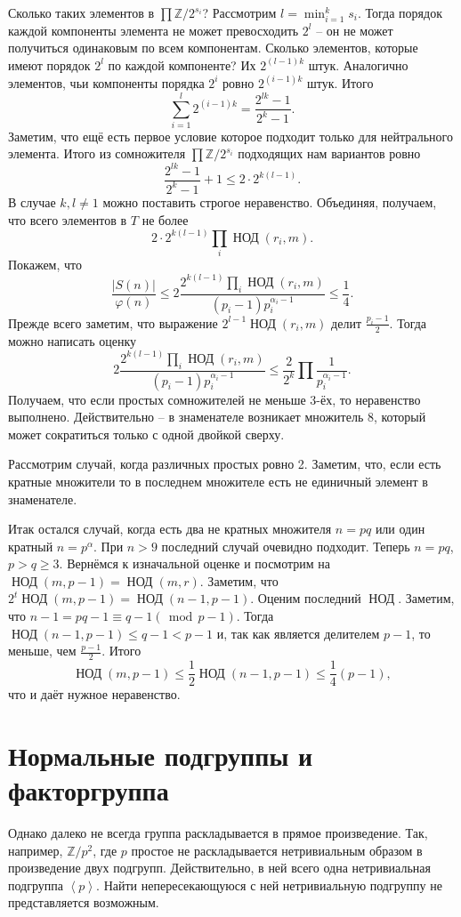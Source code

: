 \documentclass[10pt,a4paper,oneside]{book}
\theoremstyle{definition}
\renewcommand{\leq}{\leqslant}
\renewcommand{\geq}{\geqslant}
\renewcommand{\mod}{\,\operatorname{mod}\,}
\newcommand{\mb}[1]{\mathbb{#1}}
\newcommand{\Nod}{\operatorname{\text{НОД}}}
\def\ffi{\varphi}
\def\lan{\left\langle }
\def\ran{\right\rangle}
\begin{document}
Сколько таких элементов в $\prod \mb Z/2^{s_i}$? Рассмотрим $l= \min_{i=1}^k s_i$. Тогда порядок каждой компоненты элемента не может превосходить $2^l$ -- он не может получиться одинаковым по всем компонентам. Сколько элементов, которые имеют порядок $2^l$ по каждой компоненте? Их $2^{(l-1)k}$ штук. Аналогично элементов, чьи компоненты порядка  $2^i$ ровно $2^{(i-1)k}$ штук. Итого
$$\sum_{i=1}^l 2^{(i-1)k}= \frac{2^{lk}-1}{2^k-1}.$$ Заметим, что ещё есть первое условие которое подходит только для нейтрального элемента. Итого из сомножителя $\prod \mb Z/2^{s_i}$  подходящих нам вариантов ровно $$\frac{2^{lk}-1}{2^k-1}+1\leq 2\cdot 2^{k(l-1)}.$$
В случае $k,l\neq 1$ можно поставить строгое неравенство. Объединяя, получаем, что всего элементов в $T$ не более
$$2\cdot 2^{k(l-1)}\prod_i\Nod(r_i,m).$$
Покажем, что 
$$\frac{|S(n)|}{\ffi(n)}\leq 2\frac{ 2^{k(l-1)}\prod_i\Nod(r_i,m)}{(p_i-1)p_i^{\alpha_i-1}}\leq \frac{1}{4}.$$
Прежде всего заметим, что выражение $2^{l-1}\Nod(r_i,m)$ делит $\frac{p_i-1}{2}$.
Тогда можно написать оценку
$$2\frac{ 2^{k(l-1)}\prod_i\Nod(r_i,m)}{(p_i-1)p_i^{\alpha_i-1}}\leq \frac{2}{2^k}\prod \frac{1}{p_i^{\alpha_i-1}}.$$
Получаем, что если простых сомножителей не меньше 3-ёх, то неравенство выполнено. Действительно -- в знаменателе возникает множитель $8$, который может сократиться только с одной двойкой сверху. 

Рассмотрим случай, когда различных простых ровно 2. Заметим, что, если есть кратные множители то в последнем множителе есть не единичный элемент в знаменателе. 

Итак остался случай, когда есть два  не кратных множителя $n=pq$ или один кратный $n=p^{\alpha}$. При $n>9$  последний случай очевидно подходит. Теперь $n=pq$, $p>q\geq 3$. Вернёмся к изначальной оценке и посмотрим на $\Nod (m,p-1)=\Nod(m,r)$. Заметим, что $2^t \Nod (m,p-1)= \Nod(n-1,p-1)$. Оценим последний $\Nod$. Заметим, что $n-1=pq-1\equiv q-1 (\mod p-1)$.
Тогда $\Nod(n-1,p-1)\leq q-1 < p-1$ и, так как является делителем $p-1$, то меньше, чем $\frac{p-1}{2}$. 
Итого $$\Nod (m,p-1)\leq \frac{1}{2}\Nod (n-1,p-1)\leq\frac{1}{4}(p-1),$$
что и даёт нужное неравенство.
\endproof


\section{Нормальные подгруппы и факторгруппа}

Однако далеко не всегда группа раскладывается в прямое произведение. Так, например, $\mb Z/p^2$, где $p$ простое не раскладывается нетривиальным образом в произведение двух подгрупп. Действительно, в ней всего одна нетривиальная подгруппа $\lan p \ran$. Найти непересекающуюся с ней нетривиальную подгруппу не представляется возможным. 
\end{document}

